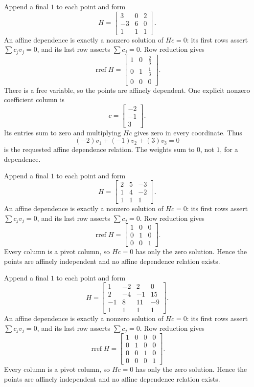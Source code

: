Append a final $1$ to each point and form
\[H=\begin{bmatrix}3&0&2\\-3&6&0\\1&1&1\end{bmatrix}.\]
An affine dependence is exactly a nonzero solution of $Hc=0$: its first rows assert $\sum c_jv_j=0$, and its last row asserts $\sum c_j=0$. Row reduction gives
\[\operatorname{rref}H=\begin{bmatrix}1&0&\frac{2}{3}\\0&1&\frac{1}{3}\\0&0&0\end{bmatrix}.\]
There is a free variable, so the points are affinely dependent. One explicit nonzero coefficient column is
\[c=\begin{bmatrix}-2\\-1\\3\end{bmatrix}.\]
Its entries sum to zero and multiplying $Hc$ gives zero in every coordinate. Thus
\[(-2)v_1 + (-1)v_2 + (3)v_3=0\]
is the requested affine dependence relation. The weights sum to $0$, not $1$, for a dependence.

Append a final $1$ to each point and form
\[H=\begin{bmatrix}2&5&-3\\1&4&-2\\1&1&1\end{bmatrix}.\]
An affine dependence is exactly a nonzero solution of $Hc=0$: its first rows assert $\sum c_jv_j=0$, and its last row asserts $\sum c_j=0$. Row reduction gives
\[\operatorname{rref}H=\begin{bmatrix}1&0&0\\0&1&0\\0&0&1\end{bmatrix}.\]
Every column is a pivot column, so $Hc=0$ has only the zero solution. Hence the points are affinely independent and no affine dependence relation exists.

Append a final $1$ to each point and form
\[H=\begin{bmatrix}1&-2&2&0\\2&-4&-1&15\\-1&8&11&-9\\1&1&1&1\end{bmatrix}.\]
An affine dependence is exactly a nonzero solution of $Hc=0$: its first rows assert $\sum c_jv_j=0$, and its last row asserts $\sum c_j=0$. Row reduction gives
\[\operatorname{rref}H=\begin{bmatrix}1&0&0&0\\0&1&0&0\\0&0&1&0\\0&0&0&1\end{bmatrix}.\]
Every column is a pivot column, so $Hc=0$ has only the zero solution. Hence the points are affinely independent and no affine dependence relation exists.

